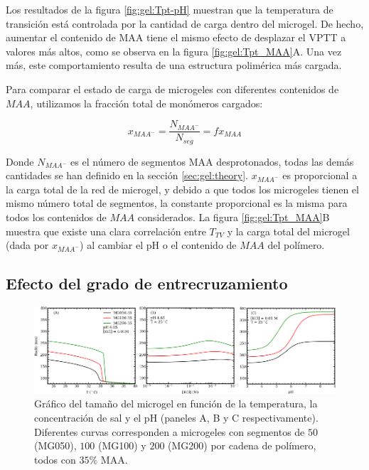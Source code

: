 Los resultados de la figura \ref{fig:gel:Tpt-pH} muestran que la temperatura de transici\'on est\'a controlada por la cantidad de carga dentro del microgel. De hecho, aumentar el contenido de MAA tiene el mismo efecto de desplazar el VPTT a valores m\'as altos, como se observa en la figura \ref{fig:gel:Tpt_MAA}A. Una vez m\'as, este comportamiento resulta de una estructura polim\'erica m\'as cargada.

Para comparar el estado de carga de microgeles con diferentes contenidos de $MAA$, utilizamos la fracci\'on total de mon\'omeros cargados:

\begin{equation}
	x_{MAA^-}=\frac{N_{MAA^-}}{N_{seg}}=f x_{MAA}
\end{equation}

Donde $N_{MAA^-}$ es el n\'umero de segmentos MAA desprotonados, todas las dem\'as cantidades se han definido en la secci\'on \ref{sec:gel:theory}. $x_{MAA^-}$ es proporcional a la carga total de la red de microgel, y debido a que todos los microgeles tienen el mismo n\'umero total de segmentos, la constante proporcional es la misma para todos los contenidos de $MAA$ considerados. La figura \ref{fig:gel:Tpt_MAA}B muestra que existe una clara correlaci\'on entre $T_{TV}$ y la carga total del microgel (dada por $x_{MAA^-}$) al cambiar el pH o el contenido de $MAA$ del pol\'imero.


\subsection{Efecto del grado de entrecruzamiento} \label{sec:gel:entrecruzamiento}


\begin{figure}[!tb]
	\centering
	\includegraphics[width=0.99\linewidth]{Figures/graph-gel/R-all_xlink.pdf}
	\caption{Gr\'afico del tama\~no del microgel en funci\'on de la temperatura, la concentraci\'on de sal y el pH (paneles A, B y C respectivamente).
		Diferentes curvas corresponden a microgeles con segmentos de $50$ (MG050), $100$ (MG100) y $200$ (MG200) por cadena de pol\'imero, todos con $35\%$ MAA.}
	\label{fig:gel:R_xlink}
\end{figure}

